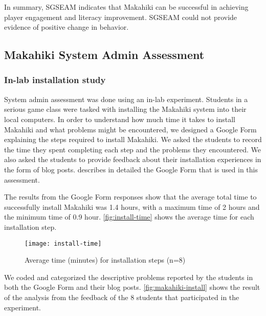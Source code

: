 In summary, SGSEAM indicates that Makahiki can be successful in achieving
player engagement and literacy improvement. SGSEAM could not provide evidence of positive change in
behavior.

\subsection{Makahiki System Admin Assessment}

\subsubsection{In-lab installation study}

System admin assessment was done using an in-lab experiment.  Students in
a serious game class were tasked with installing the Makahiki system into their local
computers. In order to understand how much time it takes to install Makahiki and what
problems might be encountered, we designed a Google Form explaining the steps required to
install Makahiki. We asked the students to record the time they spent completing each step
and the problems they encountered. We also asked the students to provide feedback about
their installation experiences in the form of blog posts. \cite{csdl2-13-04} describes in detailed
the Google Form that is used in this assessment.

The results from the Google Form responses show that the average total time to successfully install
Makahiki was 1.4 hours, with a maximum time of 2 hours and the minimum time of 0.9 hour.
\autoref{fig:install-time} shows the average time for each installation step.

\begin{figure}[ht!]
  \center
  \texttt{[image: install-time]}
  \caption{Average time (minutes) for installation steps (n=8)}
  \label{fig:install-time}
\end{figure}

We coded and categorized the descriptive problems reported by the students in both the Google Form
and their blog posts. \autoref{fig:makahiki-install} shows the result of the analysis from
the feedback of the 8 students that participated in the experiment.

